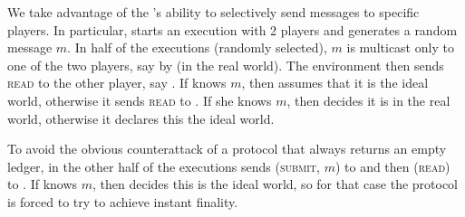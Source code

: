   \begin{proofsketch}
    We take advantage of the \adversary's ability to selectively send messages
    to specific players. In particular, \environment{} starts an execution with
    2 players and generates a random message $m$. In half of the executions
    (randomly selected), $m$ is multicast only to one of the two players, say
    \alice{} by \adversary{} (in the real world). The environment then sends
    \textsc{read} to the other player, say \bob. If \bob{} knows $m$, then
    \environment{} assumes that it is the ideal world, otherwise it sends
    \textsc{read} to \alice. If she knows $m$, then \environment{} decides it is
    in the real world, otherwise it declares this the ideal world.

    To avoid the obvious counterattack of a protocol that always returns an
    empty ledger, in the other half of the executions \environment{} sends
    (\textsc{submit}, $m$) to \alice{} and then (\textsc{read}) to \bob. If
    \bob{} knows $m$, then \environment{} decides this is the ideal world, so
    for that case the protocol is forced to try to achieve instant finality.
  \end{proofsketch}
